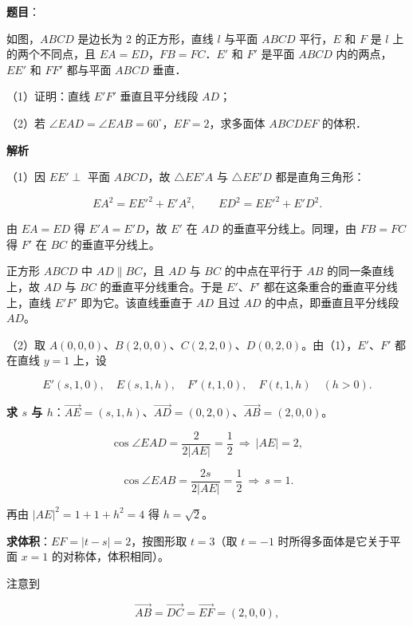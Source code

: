 \begin{answer}

\textbf{题目}：

如图，$ABCD$ 是边长为 $2$ 的正方形，直线 $l$ 与平面 $ABCD$ 平行，$E$ 和 $F$ 是 $l$ 上的两个不同点，且 $EA=ED$，$FB=FC$．$E'$ 和 $F'$ 是平面 $ABCD$ 内的两点，$EE'$ 和 $FF'$ 都与平面 $ABCD$ 垂直．
\nopagebreak[4]
\begin{center}\end{center}
\nopagebreak[4]
（1）证明：直线 $E'F'$ 垂直且平分线段 $AD$；

（2）若 $\angle EAD=\angle EAB=60^\circ$，$EF=2$，求多面体 $ABCDEF$ 的体积．

\textbf{解析}

（1）因 $EE'\perp$ 平面 $ABCD$，故 $\triangle EE'A$ 与 $\triangle EE'D$ 都是直角三角形：

\nopagebreak[4]
\[EA^2=EE'^2+E'A^2,\qquad ED^2=EE'^2+E'D^2 .\]

由 $EA=ED$ 得 $E'A=E'D$，故 $E'$ 在 $AD$ 的垂直平分线上。同理，由 $FB=FC$ 得 $F'$ 在 $BC$ 的垂直平分线上。

正方形 $ABCD$ 中 $AD\parallel BC$，且 $AD$ 与 $BC$ 的中点在平行于 $AB$ 的同一条直线上，故 $AD$ 与 $BC$ 的垂直平分线重合。于是 $E'$、$F'$ 都在这条重合的垂直平分线上，直线 $E'F'$ 即为它。该直线垂直于 $AD$ 且过 $AD$ 的中点，即垂直且平分线段 $AD$。

（2）取 $A(0,0,0)$、$B(2,0,0)$、$C(2,2,0)$、$D(0,2,0)$。由（1），$E'$、$F'$ 都在直线 $y=1$ 上，设

\nopagebreak[4]
\[E'(s,1,0),\quad E(s,1,h),\quad F'(t,1,0),\quad F(t,1,h)\quad(h>0).\]

\textbf{求 $s$ 与 $h$}：$\overrightarrow{AE}=(s,1,h)$、$\overrightarrow{AD}=(0,2,0)$、$\overrightarrow{AB}=(2,0,0)$。

\nopagebreak[4]
\[\cos\angle EAD=\frac{2}{2|AE|}=\frac12\ \Longrightarrow\ |AE|=2,\]

\nopagebreak[4]
\[\cos\angle EAB=\frac{2s}{2|AE|}=\frac12\ \Longrightarrow\ s=1 .\]

再由 $|AE|^2=1+1+h^2=4$ 得 $h=\sqrt2$。

\textbf{求体积}：$EF=|t-s|=2$，按图形取 $t=3$（取 $t=-1$ 时所得多面体是它关于平面 $x=1$ 的对称体，体积相同）。

注意到

\nopagebreak[4]
\[\overrightarrow{AB}=\overrightarrow{DC}=\overrightarrow{EF}=(2,0,0),\]


\end{answer}
